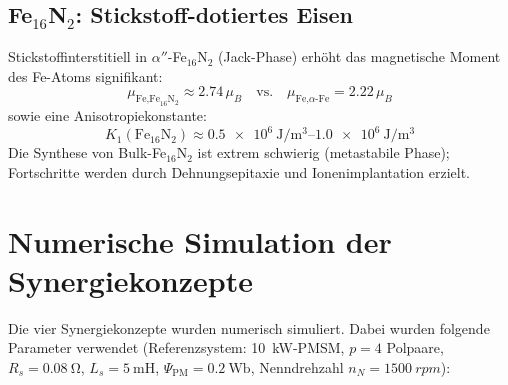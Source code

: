 ﻿\documentclass[12pt, a4paper]{report}
\theoremstyle{definition}
\theoremstyle{remark}
\begin{document}
\subsection{\texorpdfstring{Fe$_{16}$N$_2$: Stickstoff-dotiertes Eisen}{Fe16N2: Stickstoff-dotiertes Eisen}}

Stickstoffinterstitiell in $\alpha''$-Fe$_{16}$N$_2$ (Jack-Phase) erhöht das
magnetische Moment des Fe-Atoms signifikant:
\begin{equation}
  \mu_{\text{Fe,Fe}_{16}\text{N}_2} \approx 2.74\,\mu_B
  \quad \text{vs.} \quad
  \mu_{\text{Fe,}\alpha\text{-Fe}} = 2.22\,\mu_B
  \label{eq:mu_FeN}
\end{equation}
sowie eine Anisotropiekonstante:
\begin{equation}
  K_1(\text{Fe}_{16}\text{N}_2) \approx \SIrange{0.5e6}{1.0e6}{\joule\per\cubic\metre}
\end{equation}
Die Synthese von Bulk-Fe$_{16}$N$_2$ ist extrem schwierig (metastabile Phase);
Fortschritte werden durch Dehnungsepitaxie und Ionenimplantation erzielt.

\section{Numerische Simulation der Synergiekonzepte}
\label{ssec:numerik_syn}

Die vier Synergiekonzepte wurden numerisch simuliert. Dabei wurden folgende
Parameter verwendet (Referenzsystem: \SI{10}{\kilo\watt}-PMSM,
$p = 4$ Polpaare, $R_s = \SI{0.08}{\ohm}$, $L_s = \SI{5}{\milli\henry}$,
$\Psi_{\text{PM}} = \SI{0.2}{\weber}$, Nenndrehzahl $n_N = \SI{1500}{rpm}$):
\end{document}
